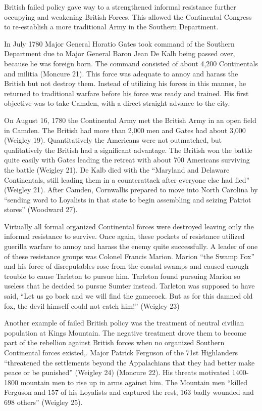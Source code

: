 British failed policy gave way to a strengthened informal resistance further occupying and weakening British Forces.  This allowed the Continental Congress to re-establish a more traditional Army in the Southern Department.

In July 1780 Major General Horatio Gates took command of the Southern Department due to Major General Baron Jean De Kalb being passed over, because he was foreign born.  The command consisted of about 4,200 Continentals and militia (Moncure 21).  This force was adequate to annoy and harass the British but not destroy them.  Instead of utilizing his forces in this manner, he returned to traditional warfare before his force was ready and trained.  His first objective was to take Camden, with a direct straight advance to the city. 

On August 16, 1780 the Continental Army met the British Army in an open field in Camden.  The British had more than 2,000 men and Gates had about 3,000 (Weigley 19).  Quantitatively the Americans were not outmatched, but qualitatively the British had a significant advantage.  The British won the battle quite easily with Gates leading the retreat with about 700 Americans surviving the battle (Weigley 21).   De Kalb died with the ``Maryland and Delaware Continentals, still leading them in a counterattack after everyone else had fled'' (Weigley 21).  After Camden, Cornwallis prepared to move into North Carolina by ``sending word to Loyalists in that state to begin assembling and seizing Patriot stores'' (Woodward 27).

Virtually all formal organized Continental forces were destroyed leaving only the informal resistance to survive.  Once again, these pockets of resistance utilized guerilla warfare to annoy and harass the enemy quite successfully.  A leader of one of these resistance groups was Colonel Francis Marion.  Marion ``the Swamp Fox'' and his force of disreputables rose from the coastal swamps and caused enough trouble to cause Tarleton to pursue him.  Tarleton found pursuing Marion so useless that he decided to pursue Sumter instead.  Tarleton was supposed to have said, ``Let us go back and we will find the gamecock.  But as for this damned old fox, the devil himself could not catch him!'' (Weigley 23)

Another example of failed British policy was the treatment of neutral civilian population at Kings Mountain. The negative treatment drove them to become part of the rebellion against British forces when no organized Southern Continental forces existed,.  Major Patrick Ferguson of the 71st Highlanders ``threatened the settlements beyond the Appalachians that they had better make peace or be punished'' (Weigley 24) (Moncure 22).  His threats motivated 1400-1800 mountain men to rise up in arms against him.  The Mountain men ``killed Ferguson and 157 of his Loyalists and captured the rest, 163 badly wounded and 698 others'' (Weigley 25). 

